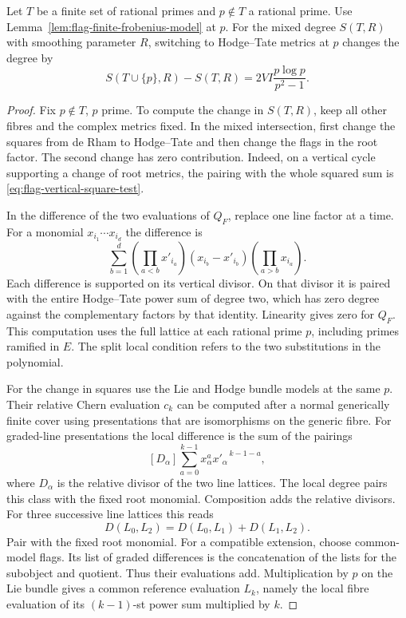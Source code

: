 \begin{lemma}\label{lem:flag-prime-change}
Let \(T\) be a finite set of rational primes and \(p\notin T\) a rational prime. Use Lemma~\ref{lem:flag-finite-frobenius-model} at \(p\). For the mixed degree \(S(T,R)\) with smoothing parameter \(R\), switching to Hodge--Tate metrics at \(p\) changes the degree by
\[
 S(T\cup\{p\},R)-S(T,R)=2VI\frac{p\log p}{p^2-1}.
\]
\end{lemma}

\begin{proof}
Fix \(p\notin T\), \(p\) prime. To compute the change in
\(S(T,R)\), keep all other fibres and the complex metrics
fixed. In the mixed intersection, first change the squares
from de Rham to Hodge--Tate and then change the flags in
the root factor. The second change has zero contribution.
Indeed, on a vertical cycle supporting a change of root metrics,
the pairing with the whole squared sum is
\eqref{eq:flag-vertical-square-test}.

In the difference of the two evaluations of \(Q_F\), replace one line factor at a time. For a monomial \(x_{i_1}\cdots x_{i_d}\) the difference is
\[
 \sum_{b=1}^d
 \left(\prod_{a<b}x'_{i_a}\right)(x_{i_b}-x'_{i_b})
 \left(\prod_{a>b}x_{i_a}\right).
\]
Each difference is supported on its vertical divisor. On that divisor it is paired with the entire Hodge--Tate power sum of degree two, which has zero degree against the complementary factors by that identity. Linearity gives zero for \(Q_F\).
This computation uses the full lattice at each rational prime \(p\), including primes ramified in \(E\). The split local
condition refers to the two substitutions in the polynomial.
\label{cor:covolume-flag-test-11}

For the change in squares use the Lie and Hodge bundle
models at the same \(p\). Their relative Chern
evaluation \(c_k\) can be computed after a normal
generically finite cover using presentations that are
isomorphisms on the generic fibre. For graded-line
presentations the local difference is the sum of the
pairings
\[
  [D_\alpha]\sum_{a=0}^{k-1}
               x_\alpha^a {x'_\alpha}^{\,k-1-a},
\]
where \(D_\alpha\) is the relative divisor of the two
line lattices. The local degree pairs this class
with the fixed root monomial. Composition adds the relative divisors. For three successive line lattices this reads
\[
 D(L_0,L_2)=D(L_0,L_1)+D(L_1,L_2).
\]
Pair with the fixed root monomial. For a compatible extension, choose common-model flags. Its list of graded differences is the concatenation of the
lists for the subobject and quotient. Thus their evaluations add. Multiplication by \(p\) on the Lie
bundle gives a common reference evaluation \(L_k\),
namely the local fibre evaluation of its
\((k-1)\)-st power sum multiplied by \(k\).


\end{proof}
